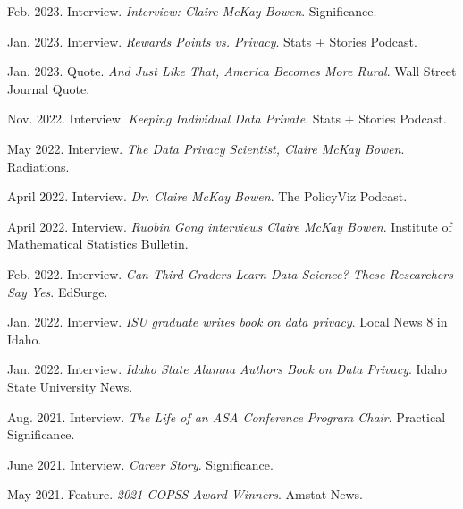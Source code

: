 \begin{etaremune}[topsep=0pt, itemsep=4pt, partopsep=0pt, parsep=0pt]
    \item Feb. 2023. Interview. \textit{Interview: Claire McKay Bowen}. Significance.
    
    \item Jan. 2023. Interview. \textit{Rewards Points vs. Privacy}. Stats + Stories Podcast.
    
    \item Jan. 2023. Quote. \textit{And Just Like That, America Becomes More Rural}. Wall Street Journal Quote.
    
    \item Nov. 2022. Interview. \textit{Keeping Individual Data Private}. Stats + Stories Podcast.
    
    \item May 2022. Interview. \textit{The Data Privacy Scientist, Claire McKay Bowen}. Radiations.
    
    \item April 2022. Interview. \textit{Dr. Claire McKay Bowen}. The PolicyViz Podcast.
    
    \item April 2022. Interview. \textit{Ruobin Gong interviews Claire McKay Bowen}. Institute of Mathematical Statistics Bulletin.
    
    \item Feb. 2022. Interview. \textit{Can Third Graders Learn Data Science? These Researchers Say Yes}. EdSurge.
    
    \item Jan. 2022. Interview. \textit{ISU graduate writes book on data privacy}. Local News 8 in Idaho.
    
    \item Jan. 2022. Interview. \textit{Idaho State Alumna Authors Book on Data Privacy}. Idaho State University News.

    \item Aug. 2021. Interview. \textit{The Life of an ASA Conference Program Chair}. Practical Significance.    

    \item June 2021. Interview. \textit{Career Story}. Significance.
    
    \item May 2021. Feature. \textit{2021 COPSS Award Winners}. Amstat News.
    

\end{etaremune}
